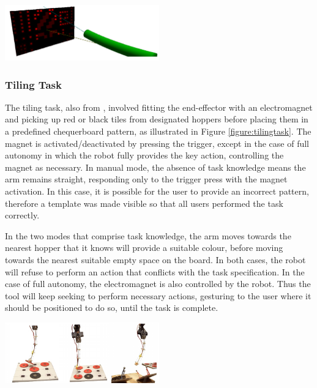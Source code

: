 \documentclass[11pt]{article}
\begin{document}
\begin{center}
\includegraphics[width=0.5\textwidth]{painting.png}
\label{figure:painting}
\end{center}

\subsubsection{Tiling Task}
The tiling task, also from \cite{GreggSmithDesign}, involved fitting the end-effector with an electromagnet and picking up red or black tiles from designated hoppers before placing them in a predefined chequerboard pattern, as illustrated in Figure \ref{figure:tilingtask}. The magnet is activated/deactivated by pressing the trigger, except in the case of full autonomy in which the robot fully provides the key action, controlling the magnet as necessary. In manual mode, the absence of task knowledge means the arm remains straight, responding only to the trigger press with the magnet activation. In this case, it is possible for the user to provide an incorrect pattern, therefore a template was made visible so that all users performed the task correctly. 

In the two modes that comprise task knowledge, the arm moves towards the nearest hopper that it knows will provide a suitable colour, before moving towards the nearest suitable empty space on the board. In both cases, the robot will refuse to perform an action that conflicts with the task specification. In the case of full autonomy, the electromagnet is also controlled by the robot. Thus the tool will keep seeking to perform necessary actions, gesturing to the user where it should be positioned to do so, until the task is complete.

\begin{center}
\includegraphics[width=0.5\textwidth]{tilingtask.png}
\label{figure:tilingtask}
\end{center}
\end{document}
